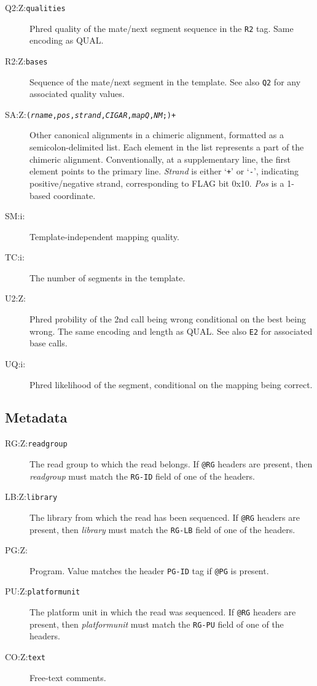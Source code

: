 \documentclass[10pt]{article}
\newcommand{\tagvalue}[1]{\tt #1}
\newcommand{\tagregex}[1]{\tt #1}
\begin{document}
\begin{description}
\item[Q2:Z:\tagvalue{qualities}]
Phred quality of the mate/next segment sequence in the {\tt R2} tag.
Same encoding as {\sf QUAL}.

\item[R2:Z:\tagvalue{bases}]
Sequence of the mate/next segment in the template.  See also {\tt Q2}
for any associated quality values.

\item[SA:Z:\tagregex{{\tt (}\emph{rname}{\tt ,}\emph{pos}{\tt ,}\emph{strand}{\tt ,}\emph{CIGAR}{\tt ,}\emph{mapQ}{\tt ,}\emph{NM}{\tt ;)}+}]
Other canonical alignments in a chimeric alignment, formatted as a semicolon-delimited list.
Each element in the list represents a part of the chimeric alignment. Conventionally, at a supplementary line, the first element points to the primary line.
\emph{Strand} is either `{\tt +}' or `{\tt -}', indicating positive/negative strand, corresponding to FLAG bit 0x10.
\emph{Pos} is a 1-based coordinate.

\item[SM:i:\tagvalue{}]
Template-independent mapping quality.

\item[TC:i:\tagvalue{}]
The number of segments in the template.

\item[U2:Z:\tagvalue{}]
Phred probility of the 2nd call being wrong conditional on the best being wrong.
The same encoding and length as {\sf QUAL}.  See also {\tt E2} for associated base calls.

\item[UQ:i:\tagvalue{}]
Phred likelihood of the segment, conditional on the mapping being correct.
\end{description}

\subsection{Metadata}

\begin{description}
\item[RG:Z:\tagvalue{readgroup}]
The read group to which the read belongs.
If {\tt @RG} headers are present, then \emph{readgroup} must match the
{\tt RG-ID} field of one of the headers.

\item[LB:Z:\tagvalue{library}]
The library from which the read has been sequenced.
If {\tt @RG} headers are present, then \emph{library} must match the
{\tt RG-LB} field of one of the headers.

\item[PG:Z:\tagvalue{}]
Program. Value matches the header {\tt PG-ID} tag if {\tt @PG} is present.

\item[PU:Z:\tagvalue{platformunit}]
The platform unit in which the read was sequenced.
If {\tt @RG} headers are present, then \emph{platformunit} must match the
{\tt RG-PU} field of one of the headers.

\item[CO:Z:\tagvalue{text}]
Free-text comments.
\end{description}
\end{document}
